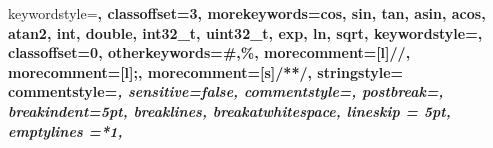 {    keywordstyle=\ttfamily\normalfont\bfseries\color{key_word_3_color},%
    classoffset=3,
    morekeywords={cos, sin, tan, asin, acos, atan2,%
    int, double, int32_t, uint32_t, exp, ln, sqrt},%
    keywordstyle=\ttfamily\normalfont\bfseries\color{key_word_4_color},%
    classoffset=0,
    otherkeywords={\#,\%},    %
     morecomment=[l]{//},%
    morecomment=[l]{;},%
    morecomment=[s]{/*}{*/}, %
    stringstyle=\color{string}%
    commentstyle=\ttfamily\normalfont\footnotesize\bfseries\itshape\color{comment},%
        sensitive=false,%
    commentstyle=\ttfamily\normalfont\footnotesize\bfseries\itshape\color{comment},%
    postbreak=\space, 
    breakindent=5pt, 
    breaklines,                            %
    breakatwhitespace,
    lineskip = 5pt,                        %
    emptylines =*1,                        %
}

   

